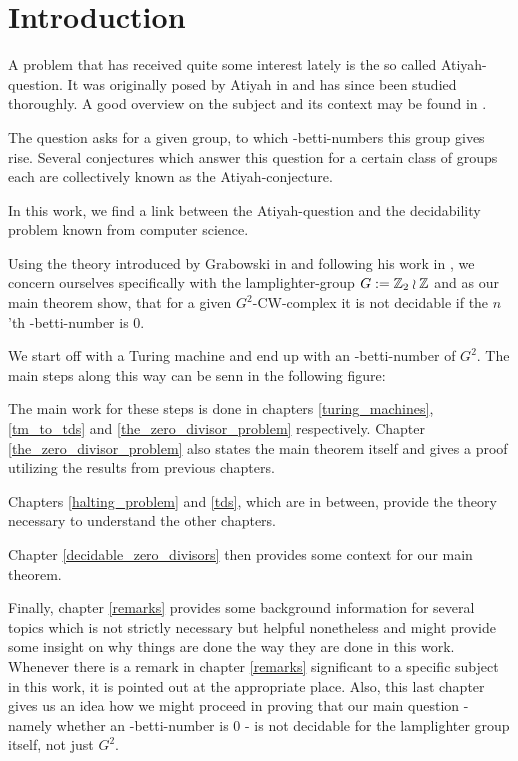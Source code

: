 \section{Introduction}

A problem that has received quite some interest lately is the so called Atiyah-question.
It was originally posed by Atiyah in \cite{ati76} and has since been studied thoroughly.
A good overview on the subject and its context may be found in \cite{luc02}.

The question asks for a given group, to which \ltwo-betti-numbers this group gives rise.
Several conjectures which answer this question for a certain class of groups each are collectively known as the Atiyah-conjecture.

In this work, we find a link between the Atiyah-question and the decidability problem known from computer science.

Using the theory introduced by Grabowski in \cite{gra14} and following his work in \cite{gra14-2}, we concern ourselves specifically with the lamplighter-group $G := \mathbb{Z}_2 \wr \mathbb{Z}$ and as our main theorem show, that for a given $G^2$-CW-complex it is not decidable if the $n$'th \ltwo-betti-number is $0$.

We start off with a Turing machine and end up with an \ltwo-betti-number of $G^2$.
The main steps along this way can be senn in the following figure:
\begin{figure}[H]
	\centering
	
\end{figure}
The main work for these steps is done in chapters \ref{turing_machines}, \ref{tm_to_tds} and \ref{the_zero_divisor_problem} respectively.
Chapter \ref{the_zero_divisor_problem} also states the main theorem itself and gives a proof utilizing the results from previous chapters.

Chapters \ref{halting_problem} and \ref{tds}, which are in between, provide the theory necessary to understand the other chapters.

Chapter \ref{decidable_zero_divisors} then provides some context for our main theorem.

Finally, chapter \ref{remarks} provides some background information for several topics which is not strictly necessary but helpful nonetheless and might provide some insight on why things are done the way they are done in this work.
Whenever there is a remark in chapter \ref{remarks} significant to a specific subject in this work, it is pointed out at the appropriate place.
Also, this last chapter gives us an idea how we might proceed in proving that our main question - namely whether an \ltwo-betti-number is $0$ - is not decidable for the lamplighter group itself, not just $G^2$.

